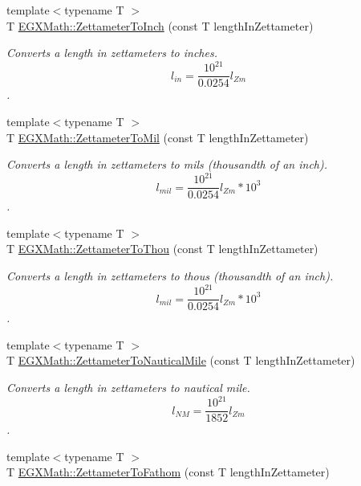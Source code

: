 \begin{DoxyCompactItemize}
{\footnotesize template$<$typename T $>$ }\\T \mbox{\hyperlink{group___e_g_x_math-_conversions-_length_conversions-_s_i-_zettameter-_imperial_gada0a88ddbf198ca1828b6c39fda34f2c}{E\+G\+X\+Math\+::\+Zettameter\+To\+Inch}} (const T length\+In\+Zettameter)
\begin{DoxyCompactList}\small\item\em Converts a length in zettameters to inches. \[ l_{in}= \frac{10^{21}}{0.0254} l_{Zm} \]. \end{DoxyCompactList}\item 
{\footnotesize template$<$typename T $>$ }\\T \mbox{\hyperlink{group___e_g_x_math-_conversions-_length_conversions-_s_i-_zettameter-_imperial_gad42b99391f53e56136f2411915c5e28d}{E\+G\+X\+Math\+::\+Zettameter\+To\+Mil}} (const T length\+In\+Zettameter)
\begin{DoxyCompactList}\small\item\em Converts a length in zettameters to mils (thousandth of an inch). \[ l_{mil}= \frac{10^{21}}{0.0254} l_{Zm} * 10^{3} \]. \end{DoxyCompactList}\item 
{\footnotesize template$<$typename T $>$ }\\T \mbox{\hyperlink{group___e_g_x_math-_conversions-_length_conversions-_s_i-_zettameter-_imperial_gacd92ac6ab3300ca582966510e369a381}{E\+G\+X\+Math\+::\+Zettameter\+To\+Thou}} (const T length\+In\+Zettameter)
\begin{DoxyCompactList}\small\item\em Converts a length in zettameters to thous (thousandth of an inch). \[ l_{mil}= \frac{10^{21}}{0.0254} l_{Zm} * 10^{3} \]. \end{DoxyCompactList}\item 
{\footnotesize template$<$typename T $>$ }\\T \mbox{\hyperlink{group___e_g_x_math-_conversions-_length_conversions-_s_i-_zettameter-_nautical_ga474eb2cb88740b3dd9e13fa6e8aa4558}{E\+G\+X\+Math\+::\+Zettameter\+To\+Nautical\+Mile}} (const T length\+In\+Zettameter)
\begin{DoxyCompactList}\small\item\em Converts a length in zettameters to nautical mile. \[ l_{NM}= \frac{10^{21}}{1852} l_{Zm} \]. \end{DoxyCompactList}\item 
{\footnotesize template$<$typename T $>$ }\\T \mbox{\hyperlink{group___e_g_x_math-_conversions-_length_conversions-_s_i-_zettameter-_nautical_ga44aa79d0db3ed37a2e2f4800467008c2}{E\+G\+X\+Math\+::\+Zettameter\+To\+Fathom}} (const T length\+In\+Zettameter)

\end{DoxyCompactItemize}
